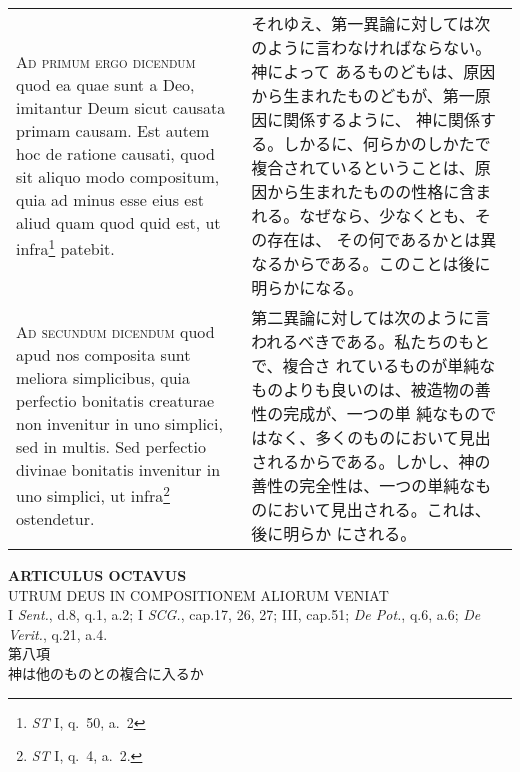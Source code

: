 \documentclass[10pt]{jsarticle}
\begin{document}
\begin{longtable}{p{21em}p{21em}}
\\


{\scshape Ad primum ergo dicendum} quod ea quae sunt a Deo, imitantur
Deum sicut causata primam causam. Est autem hoc de ratione causati,
quod sit aliquo modo compositum, quia ad minus esse eius est aliud
quam quod quid est, ut infra\footnote{{\itshape ST} I, q.~50, a.~2}
patebit.

&

それゆえ、第一異論に対しては次のように言わなければならない。神によって
あるものどもは、原因から生まれたものどもが、第一原因に関係するように、
神に関係する。しかるに、何らかのしかたで複合されているということは、原
因から生まれたものの性格に含まれる。なぜなら、少なくとも、その存在は、
その何であるかとは異なるからである。このことは後に明らかになる。

\\

{\scshape Ad secundum dicendum} quod apud nos composita sunt meliora
 simplicibus, quia perfectio bonitatis creaturae non invenitur in uno
 simplici, sed in multis. Sed perfectio divinae bonitatis invenitur in
 uno simplici, ut infra\footnote{{\itshape ST} I, q.~4, a.~2.} ostendetur.

&

第二異論に対しては次のように言われるべきである。私たちのもとで、複合さ
れているものが単純なものよりも良いのは、被造物の善性の完成が、一つの単
純なものではなく、多くのものにおいて見出されるからである。しかし、神の
善性の完全性は、一つの単純なものにおいて見出される。これは、後に明らか
にされる。

\end{longtable}

\newpage
{}
\begin{center}
 {\Large {\bf ARTICULUS OCTAVUS}}\\
 {\large UTRUM DEUS IN COMPOSITIONEM ALIORUM VENIAT}\\
 {\footnotesize I {\itshape Sent.}, d.8, q.1, a.2; I {\itshape SCG.},
 cap.17, 26, 27; III, cap.51; {\itshape De Pot.}, q.6, a.6; {\itshape De
 Verit.}, q.21, a.4.}\\
 {\Large 第八項\\神は他のものとの複合に入るか}
\end{center}
\end{document}
